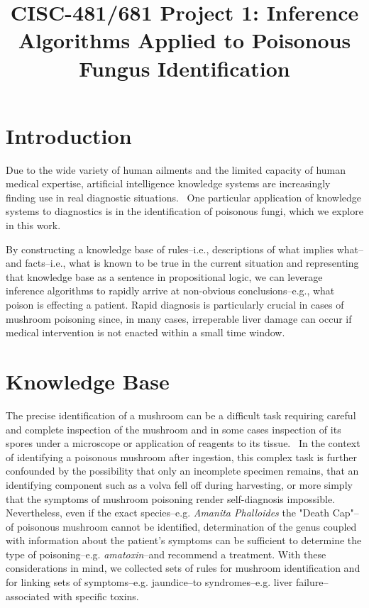 \documentclass[12pt, conference, compsocconf]{IEEEtran}
\begin{document}
\title{CISC-481/681 Project 1: Inference Algorithms Applied to Poisonous Fungus Identification}

\author{ }

\maketitle

\section{Introduction}
Due to the wide variety of human ailments and the limited capacity of human medical expertise, artificial intelligence knowledge systems are increasingly finding use in real diagnostic situations.~\cite{expert-systems-in-diagnosis}
One particular application of knowledge systems to diagnostics is in the identification of poisonous fungi, which we explore in this work. 

By constructing a knowledge base of rules--i.e., descriptions of what implies what--and facts--i.e., what is known to be true in the current situation and representing that knowledge base as a sentence in propositional logic, we can leverage inference algorithms to rapidly arrive at non-obvious conclusions--e.g., what poison is effecting a patient. 
Rapid diagnosis is particularly crucial in cases of mushroom poisoning since, in many cases, irreperable liver damage can occur if medical intervention is not enacted within a small time window.

\section{Knowledge Base}
The precise identification of a mushroom can be a difficult task requiring careful and complete inspection of the mushroom and in some cases inspection of its spores under a microscope or application of reagents to its tissue.~\cite{handbook-mushroom-poison}
In the context of identifying a poisonous mushroom after ingestion, this complex task is further confounded by the possibility that only an incomplete specimen remains, that an identifying component such as a volva fell off during harvesting, or more simply that the symptoms of mushroom poisoning render self-diagnosis impossible. 
Nevertheless, even if the exact species--e.g. \emph{Amanita Phalloides} the "Death Cap"--of poisonous mushroom cannot be identified, determination of the genus coupled with information about the patient's symptoms can be sufficient to determine the type of poisoning--e.g. \emph{amatoxin}--and recommend a treatment. 
With these considerations in mind, we collected sets of rules for mushroom identification and for linking sets of symptoms--e.g. jaundice--to syndromes--e.g. liver failure--associated with specific toxins. 
\end{document}
